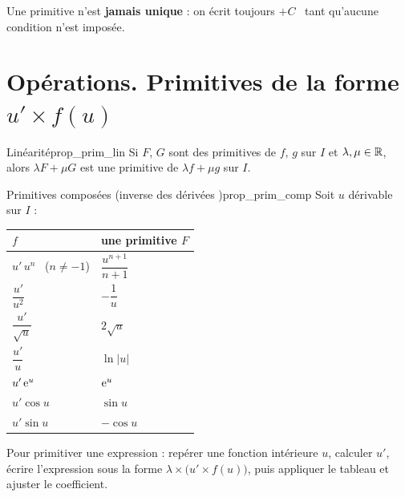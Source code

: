 \begin{attention}
	Une primitive n'est \textbf{jamais unique} : on écrit toujours \og $+C$ \fg\
	tant qu'aucune condition n'est imposée.
\end{attention}


\section{Opérations. Primitives de la forme \texorpdfstring{$u'\times f(u)$}{u' f(u)}}

\begin{propriete}{Linéarité}{prop_prim_lin}
	Si $F$, $G$ sont des primitives de $f$, $g$ sur $I$ et $\lambda,\mu\in\mathbb{R}$,
	alors $\lambda F+\mu G$ est une primitive de $\lambda f+\mu g$ sur $I$.
\end{propriete}

\begin{propriete}{Primitives composées (\og inverse des dérivées \fg)}{prop_prim_comp}
	Soit $u$ dérivable sur $I$ :
	\begin{center}
	\renewcommand{\arraystretch}{2.1}
	\setlength{\tabcolsep}{6pt}
	\begin{tabular}{>{\centering\arraybackslash}p{3.4cm}
	                >{\centering\arraybackslash}p{4.0cm}}
	\hline
	$f$ & une primitive $F$ \\
	\hline
	$u'\,u^{n}$ \ ($n\neq-1$)     & $\dfrac{u^{n+1}}{n+1}$ \\
	$\dfrac{u'}{u^{2}}$           & $-\dfrac{1}{u}$ \\
	$\dfrac{u'}{\sqrt{u}}$        & $2\sqrt{u}$ \\
	$\dfrac{u'}{u}$               & $\ln|u|$ \\
	$u'\,\mathrm{e}^{u}$                  & $\mathrm{e}^{u}$ \\
	$u'\cos u$                    & $\sin u$ \\
	$u'\sin u$                    & $-\cos u$ \\
	\hline
	\end{tabular}
	\end{center}
\end{propriete}

\begin{methode}
	Pour primitiver une expression : repérer une fonction intérieure $u$,
	calculer $u'$, écrire l'expression sous la forme
	$\lambda\times\bigl(u'\times f(u)\bigr)$, puis appliquer le tableau et
	ajuster le coefficient.
\end{methode}

